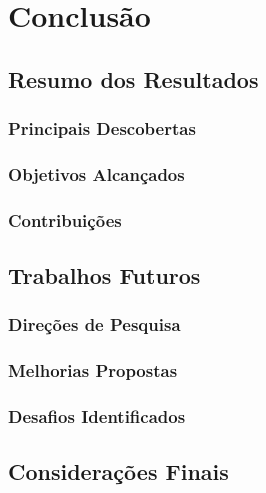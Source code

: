 

\chapter{Conclusão}
\label{cap:conclusao}

\section{Resumo dos Resultados}
\subsection{Principais Descobertas}
\subsection{Objetivos Alcançados}
\subsection{Contribuições}

\section{Trabalhos Futuros}
\subsection{Direções de Pesquisa}
\subsection{Melhorias Propostas}
\subsection{Desafios Identificados}

\section{Considerações Finais}
